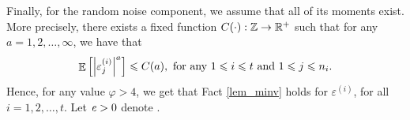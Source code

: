 Finally, for the random noise component, we assume that all of its moments exist.
More precisely, there exists a fixed function $C(\cdot) : \mathbb{Z} \rightarrow \mathbb{R}^+$ such that for any $a = 1, 2, \dots, \infty$, we have that
\begin{align}\label{assmAhigh2}
	\mathop{\mathbb{E}}\left[ \left\lvert\varepsilon_{j}^{(i)}\right\rvert^a \right] \leqslant C(a), \text{ for any } 1\leqslant i\leqslant t \text{ and } 1\leqslant j\leqslant n_i.
\end{align}
Hence, for any value $\varphi > 4$, we get that Fact \ref{lem_minv} holds for $\varepsilon^{(i)}$, for all $i = 1, 2, \dots, t$.
Let ${\mathit{e}} > 0$ denote .